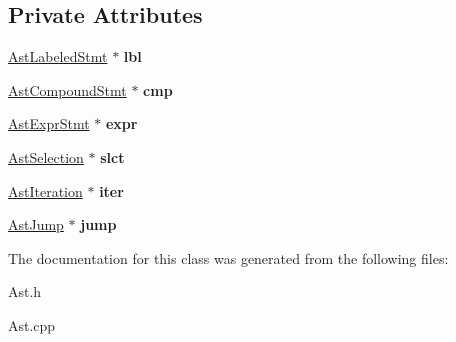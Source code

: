 \subsection*{Private Attributes}
\begin{DoxyCompactItemize}
\item 
\hypertarget{classAstStatement_ad6a4880790177b9c482e679ca57a4fbe}{\hyperlink{classAstLabeledStmt}{Ast\-Labeled\-Stmt} $\ast$ {\bfseries lbl}}\label{classAstStatement_ad6a4880790177b9c482e679ca57a4fbe}

\item 
\hypertarget{classAstStatement_a7cb384c83f44a76c7839e70e2d5ff8d1}{\hyperlink{classAstCompoundStmt}{Ast\-Compound\-Stmt} $\ast$ {\bfseries cmp}}\label{classAstStatement_a7cb384c83f44a76c7839e70e2d5ff8d1}

\item 
\hypertarget{classAstStatement_ad25436faed941dc5cf1d278e1244ff7e}{\hyperlink{classAstExprStmt}{Ast\-Expr\-Stmt} $\ast$ {\bfseries expr}}\label{classAstStatement_ad25436faed941dc5cf1d278e1244ff7e}

\item 
\hypertarget{classAstStatement_ac9d31035cc8dbbdce5fedac012c7cc39}{\hyperlink{classAstSelection}{Ast\-Selection} $\ast$ {\bfseries slct}}\label{classAstStatement_ac9d31035cc8dbbdce5fedac012c7cc39}

\item 
\hypertarget{classAstStatement_ab14e3739f049760d6c094dd15526f65f}{\hyperlink{classAstIteration}{Ast\-Iteration} $\ast$ {\bfseries iter}}\label{classAstStatement_ab14e3739f049760d6c094dd15526f65f}

\item 
\hypertarget{classAstStatement_abc6af3b0d2a6618803c3ccdbebcc42a8}{\hyperlink{classAstJump}{Ast\-Jump} $\ast$ {\bfseries jump}}\label{classAstStatement_abc6af3b0d2a6618803c3ccdbebcc42a8}

\end{DoxyCompactItemize}


The documentation for this class was generated from the following files\-:\begin{DoxyCompactItemize}
\item 
Ast.\-h\item 
Ast.\-cpp\end{DoxyCompactItemize}
